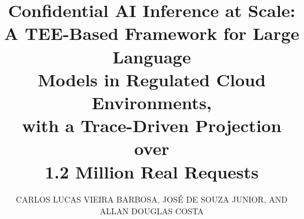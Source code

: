 \documentclass{ieeeaccess}
\begin{document}

\title{Confidential AI Inference at Scale:\\
A TEE-Based Framework for Large Language\\
Models in Regulated Cloud Environments,\\
with a Trace-Driven Projection over\\
1.2 Million Real Requests}

\author{\uppercase{Carlos Lucas Vieira Barbosa},
\uppercase{Jos\'e de Souza Junior}, AND
\uppercase{Allan Douglas Costa}}

\address[1]{Federal University of Par\'a (UFPA), Bel\'em, Par\'a, Brazil
(e-mail: carlos.barbosa@itec.ufpa.br)}
\address[2]{University of Bras\'ilia (UnB), Bras\'ilia, DF, Brazil
(e-mail: jose.souza@unb.br)}
\address[3]{Federal Rural University of the Amazon (UFRA), Bel\'em, Par\'a, Brazil
(e-mail: allan.costa@ufra.edu.br)}



\end{document}
